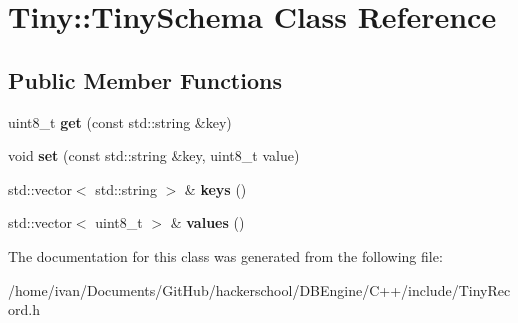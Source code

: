 \hypertarget{classTiny_1_1TinySchema}{\section{Tiny\-:\-:Tiny\-Schema Class Reference}
\label{classTiny_1_1TinySchema}
}
\subsection*{Public Member Functions}
\begin{DoxyCompactItemize}
\item 
\hypertarget{classTiny_1_1TinySchema_a602d0f1f74a400b422c8bb0a559886ae}{uint8\-\_\-t {\bfseries get} (const std\-::string \&key)}\label{classTiny_1_1TinySchema_a602d0f1f74a400b422c8bb0a559886ae}

\item 
\hypertarget{classTiny_1_1TinySchema_a341f755b6357c68508c720b40c64cc02}{void {\bfseries set} (const std\-::string \&key, uint8\-\_\-t value)}\label{classTiny_1_1TinySchema_a341f755b6357c68508c720b40c64cc02}

\item 
\hypertarget{classTiny_1_1TinySchema_a276227140cb02558cacac032c7075546}{std\-::vector$<$ std\-::string $>$ \& {\bfseries keys} ()}\label{classTiny_1_1TinySchema_a276227140cb02558cacac032c7075546}

\item 
\hypertarget{classTiny_1_1TinySchema_ab806161de972b4927d1e914a3fc14d69}{std\-::vector$<$ uint8\-\_\-t $>$ \& {\bfseries values} ()}\label{classTiny_1_1TinySchema_ab806161de972b4927d1e914a3fc14d69}

\end{DoxyCompactItemize}


The documentation for this class was generated from the following file\-:\begin{DoxyCompactItemize}
\item 
/home/ivan/\-Documents/\-Git\-Hub/hackerschool/\-D\-B\-Engine/\-C++/include/Tiny\-Record.\-h\end{DoxyCompactItemize}
